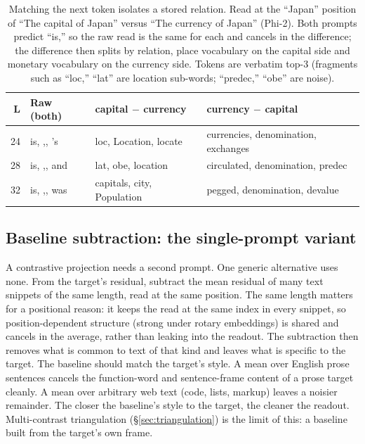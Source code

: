 \documentclass[11pt]{article}
\begin{document}
\begin{table}[htbp]
\centering
\small
\begin{tabular}{@{}rlll@{}}
\toprule
L & Raw (both) & capital $-$ currency & currency $-$ capital \\
\midrule
24 & is, ,, 's  & loc, Location, locate    & currencies, denomination, exchanges \\
28 & is, ,, and & lat, obe, location       & circulated, denomination, predec \\
32 & is, ,, was & capitals, city, Population & pegged, denomination, devalue \\
\bottomrule
\end{tabular}
\caption{Matching the next token isolates a stored relation. Read at the
``Japan'' position of ``The capital of Japan'' versus ``The currency of Japan''
(Phi-2). Both prompts predict ``is,'' so the raw read is the same for each and
cancels in the difference; the difference then splits by relation, place
vocabulary on the capital side and monetary vocabulary on the currency side.
Tokens are verbatim top-3 (fragments such as ``loc,'' ``lat'' are location
sub-words; ``predec,'' ``obe'' are noise).}
\label{tab:nexttoken}
\end{table}

\subsection{Baseline subtraction: the single-prompt variant}
\label{sec:baseline}

A contrastive projection needs a second prompt. One generic alternative uses
none. From the target's residual, subtract the mean residual of many text
snippets of the same length, read at the same position. The same length matters
for a positional reason: it keeps the read at the same index in every snippet,
so position-dependent structure (strong under rotary embeddings) is shared and
cancels in the average, rather than leaking into the readout. The subtraction then removes
what is common to text of that kind and leaves what is specific to the target.
The baseline should match the target's style. A mean over English prose sentences
cancels the function-word and sentence-frame content of a prose target cleanly.
A mean over arbitrary web text (code, lists, markup) leaves a noisier remainder.
The closer the baseline's style to the target, the cleaner the readout.
Multi-contrast triangulation (\S\ref{sec:triangulation}) is the limit of this: a
baseline built from the target's own frame.
\end{document}
